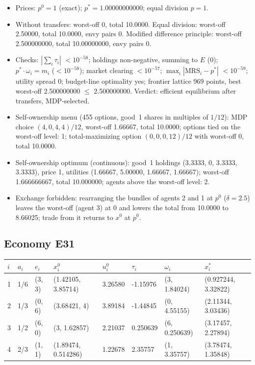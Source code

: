 \begin{itemize}[leftmargin=1.2em,itemsep=0pt,topsep=2pt]\footnotesize
\item Prices: $p^0 = 1$ (exact); $p^* = 1.00000000000$; equal division $p = 1$.
\item Without transfers: worst-off 0, total 10.0000. Equal division: worst-off 2.50000, total 10.0000, envy pairs 0. Modified difference principle: worst-off 2.500000000, total 10.00000000, envy pairs 0.
\item Checks: $|\sum_i\tau_i|$ $<10^{-58}$; holdings non-negative, summing to $E$ (0); $p^*\cdot\omega_i = m_i$ ($<10^{-58}$); market clearing $<10^{-57}$; $\max_i|\mathrm{MRS}_i - p^*|$ $<10^{-59}$; utility spread 0; budget-line optimality yes; frontier lattice 969 points, best worst-off 2.500000000 $\leq$ 2.500000000. Verdict: efficient equilibrium after transfers, MDP-selected.
\item Self-ownership menu (455 options, good~1 shares in multiples of $1/12$): MDP choice $(4, 0, 4, 4)/12$, worst-off 1.66667, total 10.0000; options tied on the worst-off level: 1; total-maximizing option $(0, 0, 0, 12)/12$ with worst-off 0, total 10.0000.
\item Self-ownership optimum (continuous): good~1 holdings (3.3333, 0, 3.3333, 3.3333), price 1, utilities (1.66667, 5.00000, 1.66667, 1.66667); worst-off 1.666666667, total 10.000000; agents above the worst-off level: 2.
\item Exchange forbidden: rearranging the bundles of agents 2 and 1 at $p^0$ ($\delta = 2.5$) leaves the worst-off (agent 3) at 0 and lowers the total from 10.0000 to 8.66025; trade from it returns to $x^0$ at $p^0$.
\end{itemize}

\subsection*{Economy E31}
\label{ec:E31}
{\scriptsize\setlength{\tabcolsep}{3pt}
\begin{tabular}{@{}llllllll@{}}
\toprule
$i$ & $a_i$ & $e_i$ & $x^0_i$ & $u^0_i$ & $\tau_i$ & $\omega_i$ & $x^*_i$ \\
\midrule
1 & 1/6 & (3, 3) & (1.42105, 3.85714) & 3.26580 & -1.15976 & (3, 1.84024) & (0.927244, 3.32822) \\
2 & 1/3 & (0, 6) & (3.68421, 4) & 3.89184 & -1.44845 & (0, 4.55155) & (2.11344, 3.03436) \\
3 & 1/2 & (6, 0) & (3, 1.62857) & 2.21037 & 0.250639 & (6, 0.250639) & (3.17457, 2.27894) \\
4 & 2/3 & (1, 1) & (1.89474, 0.514286) & 1.22678 & 2.35757 & (1, 3.35757) & (3.78474, 1.35848) \\
\bottomrule\end{tabular}}

